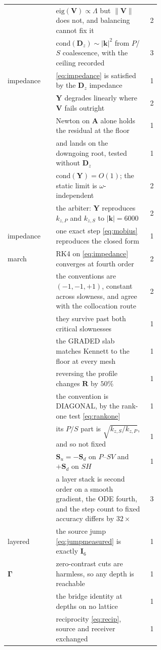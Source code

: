 \documentclass[11pt,a4paper]{article}
\newcommand{\bA}{\mathbf{A}}
\newcommand{\bS}{\mathbf{S}}
\newcommand{\bV}{\mathbf{V}}
\newcommand{\Isix}{\mathbf{I}_{6}}
\newcommand{\bR}{\mathbf{R}}
\newcommand{\bY}{\mathbf{Y}}
\begin{document}
\begin{longtable}{@{}l>{\raggedright\arraybackslash}p{0.60\linewidth}r@{}}
  & $\mathrm{eig}(\bV)\propto\Lambda$ but $\|\bV\|$ does not, and balancing
    cannot fix it & 2\\
  & $\mathrm{cond}(\mathbf{D}_z)\sim|\mathbf{k}|^2$ from $P$/$S$ coalescence,
    with the ceiling recorded & 3\\
\midrule
impedance & \eqref{eq:impedance} is satisfied by the $\mathbf{D}_z$ impedance & 1\\
  & $\bY$ degrades linearly where $\bV$ fails outright & 2\\
  & Newton on $\bA$ alone holds the residual at the floor & 1\\
  & and lands on the downgoing root, tested without $\mathbf{D}_z$ & 1\\
  & $\mathrm{cond}(\bY) = O(1)$; the static limit is $\omega$-independent & 2\\
  & the arbiter: $\bY$ reproduces $k_{z,P}$ and $k_{z,S}$ to $|\mathbf{k}|=6000$ & 2\\
\midrule
impedance & one exact step \eqref{eq:mobius} reproduces the closed form & 1\\
  march & RK4 on \eqref{eq:impedance} converges at fourth order & 2\\
  & the conventions are $(-1,-1,+1)$, constant across slowness, and
    agree with the collocation route & 2\\
  & they survive past both critical slownesses & 1\\
  & the GRADED slab matches Kennett to the floor at every mesh & 1\\
  & reversing the profile changes $\bR$ by $50\%$ & 1\\
  & the convention is DIAGONAL, by the rank-one test \eqref{eq:rankone} & 1\\
  & its $P/S$ part is $\sqrt{k_{z,S}/k_{z,P}}$, and so not fixed & 1\\
  & $\bS_u=-\bS_d$ on $P$--$SV$ and $+\bS_d$ on $SH$ & 1\\
  & a layer stack is second order on a smooth gradient, the ODE fourth,
    and the step count to fixed accuracy differs by $32\times$ & 3\\
\midrule
layered & the source jump \eqref{eq:jumpmeasured} is exactly $\Isix$ & 1\\
  $\boldsymbol\Gamma$ & zero-contrast cuts are harmless, so any depth is reachable & 1\\
  & the bridge identity at depths on no lattice & 1\\
  & reciprocity \eqref{eq:recip}, source and receiver exchanged & 1\\

\end{longtable}
\end{document}
